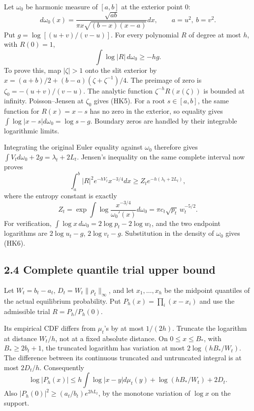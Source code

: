\documentclass[10pt]{article}
\begin{document}
Let \(\omega_0\) be harmonic measure of \([a,b]\) at the exterior point 0: \[
 d\omega_0(x)=\frac{\sqrt{ab}}{\pi x\sqrt{(b-x)(x-a)}}dx,
 \qquad a=u^2,\ b=v^2.
\] Put \(g=\log[(u+v)/(v-u)]\). For every polynomial \(R\) of degree at most \(h\), with \(R(0)=1\), \[
 \int\log|R|\,d\omega_0\ge-hg.
 \tag{HK5}
\] To prove this, map \(|\zeta|>1\) onto the slit exterior by \(x=(a+b)/2+(b-a)(\zeta+\zeta^{-1})/4\). The preimage of zero is \(\zeta_0=-(u+v)/(v-u)\). The analytic function \(\zeta^{-h}R(x(\zeta))\) is bounded at infinity. Poisson--Jensen at \(\zeta_0\) gives (HK5). For a root \(s\in[a,b]\), the same function for \(R(x)=x-s\) has no zero in the exterior, so equality gives \(\int\log|x-s|d\omega_0=\log s-g\). Boundary zeros are handled by their integrable logarithmic limits.

Integrating the original Euler equality against \(\omega_0\) therefore gives \(\int V_t d\omega_0+2g=\lambda_t+2L_t\). Jensen's inequality on the same complete interval now proves \[
 \int_a^b |R|^2e^{-hV_t}x^{-3/4}dx
 \ge Z_t e^{-h(\lambda_t+2L_t)},
\] where the entropy constant is exactly \[
 \boxed{Z_t=\exp\int\log\frac{x^{-3/4}}{\omega_0'(x)}d\omega_0
 =\pi c_t\sqrt{p_t}\,w_t^{-5/2}.}
 \tag{HK6}
\] For verification, \(\int\log x\,d\omega_0=2\log p_t-2\log w_t\), and the two endpoint logarithms are \(2\log u_t-g\), \(2\log v_t-g\). Substitution in the density of \(\omega_0\) gives (HK6).

\subsection{2.4 Complete quantile trial upper bound}\label{complete-quantile-trial-upper-bound}

Let \(W_t=b_t-a_t\), \(D_t=W_t\|\rho_t\|_\infty\), and let \(x_1,\ldots,x_h\) be the midpoint quantiles of the actual equilibrium probability. Put \(P_h(x)=\prod_i(x-x_i)\) and use the admissible trial \(R=P_h/P_h(0)\).

Its empirical CDF differs from \(\mu_t\)'s by at most \(1/(2h)\). Truncate the logarithm at distance \(W_t/h\), not at a fixed absolute distance. On \(0\le x\le B_*\), with \(B_*\ge2b_t+1\), the truncated logarithm has variation at most \(2\log(hB_*/W_t)\). The difference between its continuous truncated and untruncated integral is at most \(2D_t/h\). Consequently \[
 \log|P_h(x)|\le h\int\log|x-y|d\mu_t(y)
 +\log(hB_*/W_t)+2D_t.
\] Also \(|P_h(0)|^2\ge(a_t/b_t)e^{2hL_t}\), by the monotone variation of \(\log x\) on the support.
\end{document}
